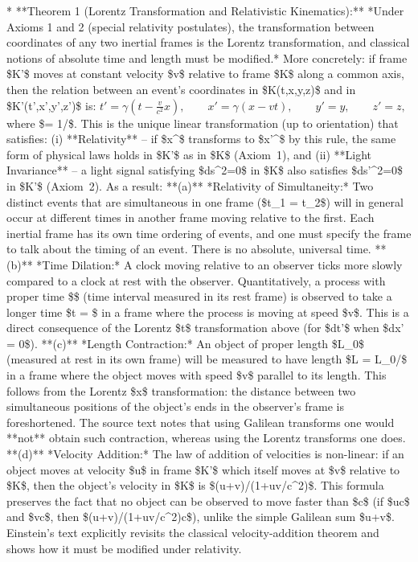 \documentclass{article}
\begin{document}
* **Theorem 1 (Lorentz Transformation and Relativistic Kinematics):** *Under Axioms 1 and 2 (special relativity postulates), the transformation between coordinates of any two inertial frames is the Lorentz transformation, and classical notions of absolute time and length must be modified.* More concretely: if frame \$K'\$ moves at constant velocity \$v\$ relative to frame \$K\$ along a common axis, then the relation between an event’s coordinates in \$K(t,x,y,z)\$ and in \$K'(t',x',y',z')\$ is:
  $t' = \gamma (t - \frac{v}{c^2}x), \qquad x' = \gamma (x - vt), \qquad y' = y, \qquad z' = z,$
  where \$\gamma = 1/\$. This is the unique linear transformation (up to orientation) that satisfies: (i) **Relativity** – if \$x^\mu\$ transforms to \$x'^\mu\$ by this rule, the same form of physical laws holds in \$K'\$ as in \$K\$ (Axiom 1), and (ii) **Light Invariance** – a light signal satisfying \$ds^2=0\$ in \$K\$ also satisfies \$ds'^2=0\$ in \$K'\$ (Axiom 2). As a result:
  **(a)** *Relativity of Simultaneity:* Two distinct events that are simultaneous in one frame (\$t\_1 = t\_2\$) will in general occur at different times in another frame moving relative to the first. Each inertial frame has its own time ordering of events, and one must specify the frame to talk about the timing of an event. There is no absolute, universal time.
  **(b)** *Time Dilation:* A clock moving relative to an observer ticks more slowly compared to a clock at rest with the observer. Quantitatively, a process with proper time \$\Delta \tau\$ (time interval measured in its rest frame) is observed to take a longer time \$\Delta t = \gamma \Delta \tau\$ in a frame where the process is moving at speed \$v\$. This is a direct consequence of the Lorentz \$t\$ transformation above (for \$dt'\$ when \$dx' = 0\$).
  **(c)** *Length Contraction:* An object of proper length \$L\_0\$ (measured at rest in its own frame) will be measured to have length \$L = L\_0/\gamma\$ in a frame where the object moves with speed \$v\$ parallel to its length. This follows from the Lorentz \$x\$ transformation: the distance between two simultaneous positions of the object’s ends in the observer’s frame is foreshortened. The source text notes that using Galilean transforms one would **not** obtain such contraction, whereas using the Lorentz transforms one does.
  **(d)** *Velocity Addition:* The law of addition of velocities is non-linear: if an object moves at velocity \$u\$ in frame \$K'\$ which itself moves at \$v\$ relative to \$K\$, then the object’s velocity in \$K\$ is \$(u+v)/(1+uv/c^2)\$. This formula preserves the fact that no object can be observed to move faster than \$c\$ (if \$u\<c\$ and \$v\<c\$, then \$(u+v)/(1+uv/c^2)\<c\$), unlike the simple Galilean sum \$u+v\$. Einstein’s text explicitly revisits the classical velocity-addition theorem and shows how it must be modified under relativity.
\end{document}
